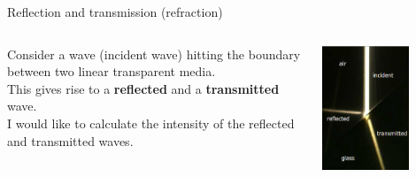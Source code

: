 %
%
%

\begin{frame}{Reflection and transmission (refraction)}

\begin{columns}
  \begin{column}{0.40\textwidth}
      Consider a wave (incident wave) hitting the boundary
      between two linear transparent media.\\
      \vspace{0.2cm}
      This gives rise to a {\bf reflected} and a {\bf transmitted} wave.\\
      \vspace{0.2cm}
      I would like to calculate the intensity of the reflected and
      transmitted waves.\\
  \end{column}
  \begin{column}{0.60\textwidth}
    \begin{center}
      \includegraphics[width=0.66\textwidth]{./images/photos/still_interference_refraction.png}\\
    \end{center}
  \end{column}
\end{columns}


\end{frame}

